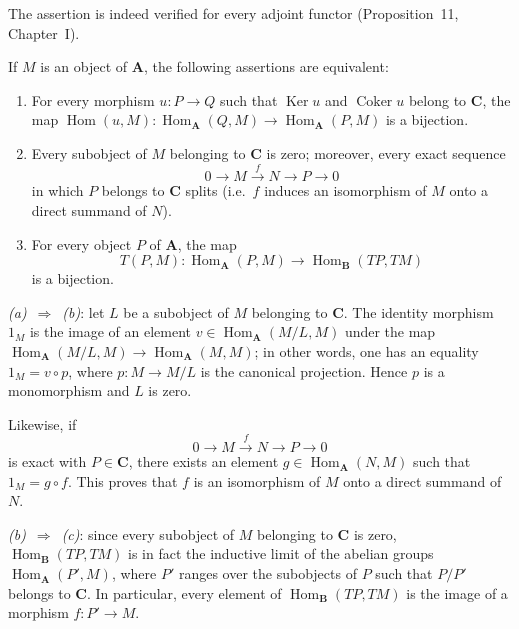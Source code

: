 The assertion is indeed verified for every adjoint functor (Proposition~11,
Chapter~I).

\begin{lemma}
If $M$ is an object of $\mathbf A$, the following assertions are
equivalent:
\begin{enumerate}
\item[a.] For every morphism $u\colon P\to Q$ such that $\operatorname{Ker}u$
      and $\operatorname{Coker}u$ belong to $\mathbf C$, the map
      $\operatorname{Hom}(u,M)\colon
      \operatorname{Hom}_{\mathbf A}(Q,M)\to
      \operatorname{Hom}_{\mathbf A}(P,M)$ is a bijection.
\item[b.] Every subobject of $M$ belonging to $\mathbf C$ is zero; moreover,
      every exact sequence
      \[
        0\longrightarrow M\xrightarrow{\;f\;}N\longrightarrow P
        \longrightarrow 0
      \]
      in which $P$ belongs to $\mathbf C$ splits (i.e.\ $f$ induces an
      isomorphism of $M$ onto a direct summand of $N$).
\item[c.] For every object $P$ of $\mathbf A$, the map
      \[
        T(P,M)\colon \operatorname{Hom}_{\mathbf A}(P,M)
        \longrightarrow \operatorname{Hom}_{\mathbf B}(TP,TM)
      \]
      is a bijection.
\end{enumerate}
\end{lemma}

\emph{(a)}~$\Rightarrow$~\emph{(b)}: let $L$ be a subobject of $M$
belonging to $\mathbf C$. The identity morphism $1_M$ is the image of an
element $v\in\operatorname{Hom}_{\mathbf A}(M/L,M)$ under the map
$\operatorname{Hom}_{\mathbf A}(M/L,M)\to\operatorname{Hom}_{\mathbf A}(M,M)$;
in other words, one has an equality $1_M=v\circ p$, where
$p\colon M\to M/L$ is the canonical projection. Hence $p$ is a
monomorphism and $L$ is zero.

Likewise, if
\[
  0\longrightarrow M\xrightarrow{\;f\;}N\longrightarrow P\longrightarrow 0
\]
is exact with $P\in\mathbf C$, there exists an element $g\in
\operatorname{Hom}_{\mathbf A}(N,M)$ such that $1_M=g\circ f$. This
proves that $f$ is an isomorphism of $M$ onto a direct summand of $N$.

\emph{(b)}~$\Rightarrow$~\emph{(c)}: since every subobject of $M$ belonging
to $\mathbf C$ is zero, $\operatorname{Hom}_{\mathbf B}(TP,TM)$ is in
fact the inductive limit of the abelian groups $\operatorname{Hom}_{\mathbf
A}(P',M)$, where $P'$ ranges over the subobjects of $P$ such that
$P/P'$ belongs to $\mathbf C$. In particular, every element of
$\operatorname{Hom}_{\mathbf B}(TP,TM)$ is the image of a morphism
$f\colon P'\to M$.

